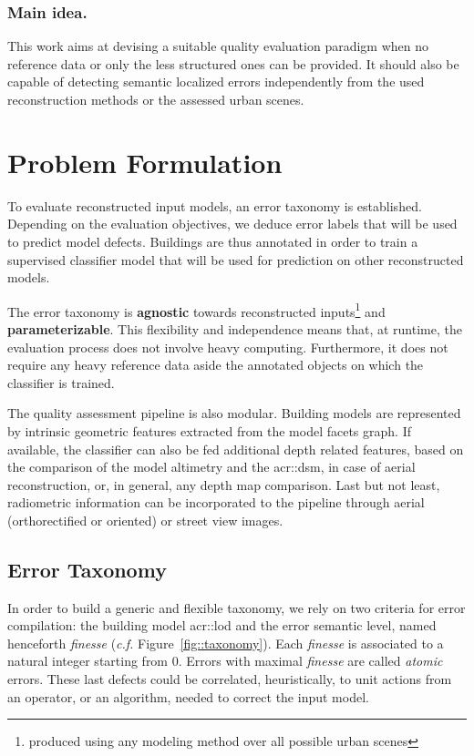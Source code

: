 \documentclass[runningheads]{llncs}
\begin{document}
\subsubsection{Main idea.}
This work aims at devising a suitable quality evaluation paradigm when no reference data or only the less structured ones can be provided. It should also be capable of detecting semantic localized errors independently from the used reconstruction methods or the assessed urban scenes.

\section{Problem Formulation}

To evaluate reconstructed input models, an error taxonomy is established. Depending on the evaluation objectives, we deduce error labels that will be used to predict model defects. Buildings are thus annotated in order to train a supervised classifier model that will be used for prediction on other reconstructed models.

The error taxonomy is \textbf{agnostic} towards reconstructed inputs\footnote{produced using any modeling method over all possible urban scenes} and \textbf{parameterizable}. This flexibility and independence means that, at runtime, the evaluation process does not involve heavy computing. Furthermore, it does not require any heavy reference data aside the annotated objects on which the classifier is trained.

The quality assessment pipeline is also modular. Building models are represented by intrinsic geometric features extracted from the model facets graph. If available, the classifier can also be fed additional depth related features, based on the comparison of the model altimetry and the \acrshort{acr::dsm}, in case of aerial reconstruction, or, in general, any depth map comparison. Last but not least, radiometric information can be incorporated to the pipeline through aerial (orthorectified or oriented) or street view images.

\subsection{Error Taxonomy}
In order to build a generic and flexible taxonomy, we rely on two criteria for error compilation: the building model \acrshort{acr::lod} and the error semantic level, named henceforth \textit{finesse} (\textit{c.f.} Figure~\ref{fig::taxonomy}). Each \textit{finesse} is associated to a natural integer starting from $0$. Errors with maximal \textit{finesse} are called \textit{atomic} errors. These last defects could be correlated, heuristically, to unit actions from an operator, or an algorithm, needed to correct the input model.
\end{document}
